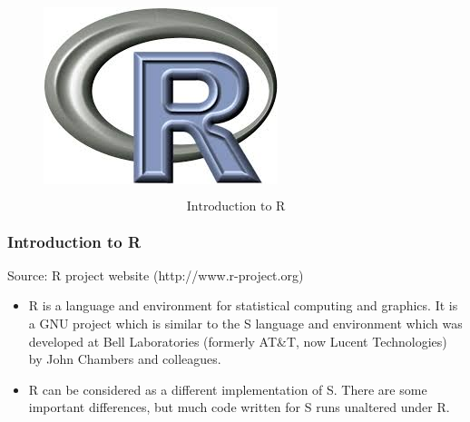 \documentclass{beamer}
\begin{document}
 	\begin{frame}
 		\begin{figure}
 			\centering
 			\includegraphics[width=0.9\linewidth]{Rlogo}
 		\end{figure}
 		\[ \mbox{Introduction to R} \] 
 	\end{frame}
 	
 	\begin{frame}
 		\frametitle{Introduction to R}
 		Source: R project website (http://www.r-project.org)
 		\begin{itemize}
 			\item R is a language and environment for statistical computing and graphics. It is a GNU project
 			which is similar to the S language and environment which was developed at Bell Laboratories
 			(formerly AT\&T, now Lucent Technologies) by John Chambers and colleagues. 
 			\item R can be considered
 			as a different implementation of S. There are some important differences, but much
 			code written for S runs unaltered under R.
 		\end{itemize}
 		
 	\end{frame}
 	
\end{document}
